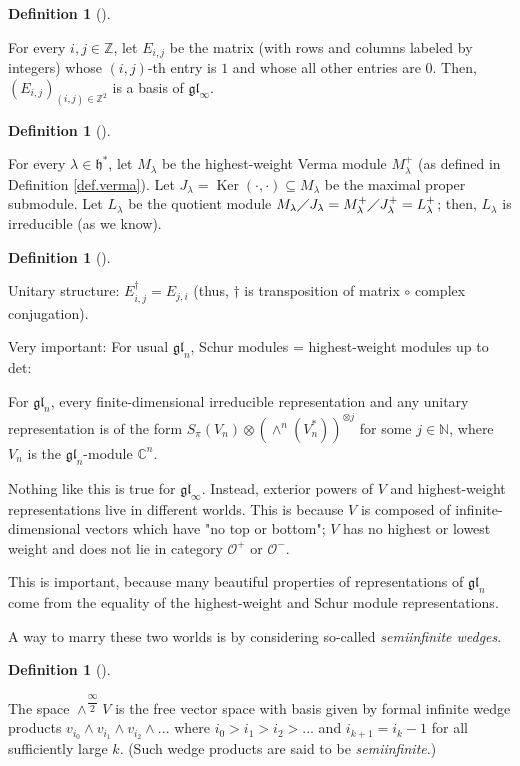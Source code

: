\documentclass
[numbers=enddot,12pt,final,onecolumn,german,notitlepage]{scrartcl}%
\theoremstyle{definition}
\newtheorem{defi}[theo]{Definition}
\newenvironment{definition}[1][]
{\begin{defi}[#1]\begin{leftbar}}
{\end{leftbar}\end{defi}}
\begin{document}
\begin{definition}
For every $i,j\in\mathbb{Z}$, let $E_{i,j}$ be the matrix (with rows and
columns labeled by integers) whose $\left(  i,j\right)  $-th entry is $1$ and
whose all other entries are $0$. Then, $\left(  E_{i,j}\right)  _{\left(
i,j\right)  \in\mathbb{Z}^{2}}$ is a basis of $\mathfrak{gl}_{\infty}$.
\end{definition}

\begin{definition}
For every $\lambda\in\mathfrak{h}^{\ast}$, let $M_{\lambda}$ be the
highest-weight Verma module $M_{\lambda}^{+}$ (as defined in Definition
\ref{def.verma}). Let $J_{\lambda}=\operatorname*{Ker}\left(  \cdot
,\cdot\right)  \subseteq M_{\lambda}$ be the maximal proper submodule. Let
$L_{\lambda}$ be the quotient module $M_{\lambda}\diagup J_{\lambda
}=M_{\lambda}^{+}\diagup J_{\lambda}^{+}=L_{\lambda}^{+}$; then, $L_{\lambda}$
is irreducible (as we know).
\end{definition}

\begin{definition}
Unitary structure: $E_{i,j}^{\dag}=E_{j,i}$ (thus, $\dag$ is transposition of
matrix $\circ$ complex conjugation).
\end{definition}

Very important: For usual $\mathfrak{gl}_{n}$, Schur modules = highest-weight
modules up to det:

For $\mathfrak{gl}_{n}$, every finite-dimensional irreducible representation
and any unitary representation is of the form $S_{\pi}\left(  V_{n}\right)
\otimes\left(  \wedge^{n}\left(  V_{n}^{\ast}\right)  \right)  ^{\otimes j}$
for some $j\in\mathbb{N}$, where $V_{n}$ is the $\mathfrak{gl}_{n}$-module
$\mathbb{C}^{n}$.

Nothing like this is true for $\mathfrak{gl}_{\infty}$. Instead, exterior
powers of $V$ and highest-weight representations live in different worlds.
This is because $V$ is composed of infinite-dimensional vectors which have "no
top or bottom"; $V$ has no highest or lowest weight and does not lie in
category $\mathcal{O}^{+}$ or $\mathcal{O}^{-}$.

This is important, because many beautiful properties of representations of
$\mathfrak{gl}_{n}$ come from the equality of the highest-weight and Schur
module representations.

A way to marry these two worlds is by considering so-called
\textit{semiinfinite wedges}.

\begin{definition}
The space $\wedge^{\dfrac{\infty}{2}}V$ is the free vector space with basis
given by formal infinite wedge products $v_{i_{0}}\wedge v_{i_{1}}\wedge
v_{i_{2}}\wedge...$ where $i_{0}>i_{1}>i_{2}>...$ and $i_{k+1}=i_{k}-1$ for
all sufficiently large $k$. (Such wedge products are said to be
\textit{semiinfinite}.)
\end{definition}
\end{document}
